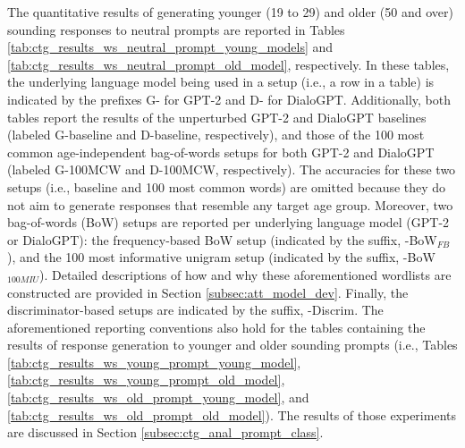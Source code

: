 
The quantitative results of generating younger (19 to 29) and older (50 and over) sounding responses to neutral prompts are reported in Tables \ref{tab:ctg_results_ws_neutral_prompt_young_models} and \ref{tab:ctg_results_ws_neutral_prompt_old_model}, respectively. In these tables, the underlying language model being used in a setup (i.e., a row in a table) is indicated by the prefixes G- for GPT-2 and D- for DialoGPT. Additionally, both tables report the results of the unperturbed GPT-2 and DialoGPT baselines (labeled G-baseline and D-baseline, respectively), and those of the 100 most common age-independent bag-of-words setups for both GPT-2 and DialoGPT (labeled G-100MCW and D-100MCW, respectively). The accuracies for these two setups (i.e., baseline and 100 most common words) are omitted because they do not aim to generate responses that resemble any target age group. Moreover, two bag-of-words (BoW) setups are reported per underlying language model (GPT-2 or DialoGPT): the frequency-based BoW setup (indicated by the suffix, -BoW$_{FB}$), and the 100 most informative unigram setup (indicated by the suffix, -BoW$_{100MIU}$). Detailed descriptions of how and why these aforementioned wordlists are constructed are provided in Section \ref{subsec:att_model_dev}. Finally, the discriminator-based setups are indicated by the suffix, -Discrim. The aforementioned reporting conventions also hold for the tables containing the results of response generation to younger and older sounding prompts (i.e., Tables \ref{tab:ctg_results_ws_young_prompt_young_model}, \ref{tab:ctg_results_ws_young_prompt_old_model}, \ref{tab:ctg_results_ws_old_prompt_young_model}, and \ref{tab:ctg_results_ws_old_prompt_old_model}). The results of those experiments are discussed in Section \ref{subsec:ctg_anal_prompt_class}.

